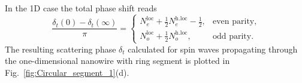 In the 1D case the total phase shift reads~\cite{Dong00b}
\begin{equation} \label{eq:Levinson}
\frac{\delta_t(0)-\delta_t(\infty)}{\pi} = 
\begin{cases}
N_e^{\text{loc}} + \frac12 N_e^{\text{h.loc}} -\frac12, 	& \text{even parity},\\
N_o^{\text{loc}} + \frac12 N_o^{\text{h.loc}}, 			& \text{odd parity}.
\end{cases}
\end{equation}
The resulting scattering phase $\delta_t$ calculated for spin waves propagating through the one-dimensional nanowire with ring segment is plotted in Fig.~\ref{fig:Circular_segment_1}(d).